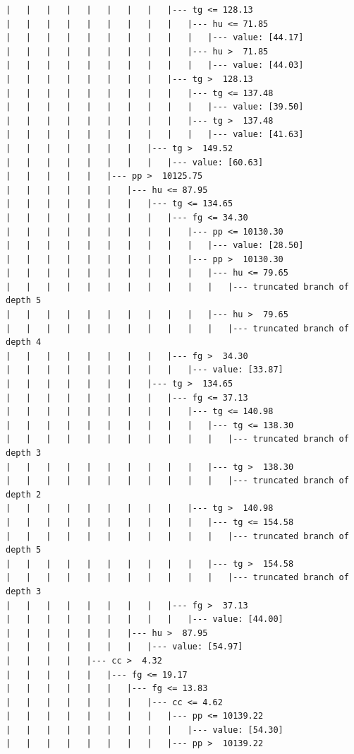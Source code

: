 \documentclass[UTF8, a4paper]{ctexart}
\begin{document}
\begin{lstlisting}
|   |   |   |   |   |   |   |   |--- tg <= 128.13
|   |   |   |   |   |   |   |   |   |--- hu <= 71.85
|   |   |   |   |   |   |   |   |   |   |--- value: [44.17]
|   |   |   |   |   |   |   |   |   |--- hu >  71.85
|   |   |   |   |   |   |   |   |   |   |--- value: [44.03]
|   |   |   |   |   |   |   |   |--- tg >  128.13
|   |   |   |   |   |   |   |   |   |--- tg <= 137.48
|   |   |   |   |   |   |   |   |   |   |--- value: [39.50]
|   |   |   |   |   |   |   |   |   |--- tg >  137.48
|   |   |   |   |   |   |   |   |   |   |--- value: [41.63]
|   |   |   |   |   |   |   |--- tg >  149.52
|   |   |   |   |   |   |   |   |--- value: [60.63]
|   |   |   |   |   |--- pp >  10125.75
|   |   |   |   |   |   |--- hu <= 87.95
|   |   |   |   |   |   |   |--- tg <= 134.65
|   |   |   |   |   |   |   |   |--- fg <= 34.30
|   |   |   |   |   |   |   |   |   |--- pp <= 10130.30
|   |   |   |   |   |   |   |   |   |   |--- value: [28.50]
|   |   |   |   |   |   |   |   |   |--- pp >  10130.30
|   |   |   |   |   |   |   |   |   |   |--- hu <= 79.65
|   |   |   |   |   |   |   |   |   |   |   |--- truncated branch of depth 5
|   |   |   |   |   |   |   |   |   |   |--- hu >  79.65
|   |   |   |   |   |   |   |   |   |   |   |--- truncated branch of depth 4
|   |   |   |   |   |   |   |   |--- fg >  34.30
|   |   |   |   |   |   |   |   |   |--- value: [33.87]
|   |   |   |   |   |   |   |--- tg >  134.65
|   |   |   |   |   |   |   |   |--- fg <= 37.13
|   |   |   |   |   |   |   |   |   |--- tg <= 140.98
|   |   |   |   |   |   |   |   |   |   |--- tg <= 138.30
|   |   |   |   |   |   |   |   |   |   |   |--- truncated branch of depth 3
|   |   |   |   |   |   |   |   |   |   |--- tg >  138.30
|   |   |   |   |   |   |   |   |   |   |   |--- truncated branch of depth 2
|   |   |   |   |   |   |   |   |   |--- tg >  140.98
|   |   |   |   |   |   |   |   |   |   |--- tg <= 154.58
|   |   |   |   |   |   |   |   |   |   |   |--- truncated branch of depth 5
|   |   |   |   |   |   |   |   |   |   |--- tg >  154.58
|   |   |   |   |   |   |   |   |   |   |   |--- truncated branch of depth 3
|   |   |   |   |   |   |   |   |--- fg >  37.13
|   |   |   |   |   |   |   |   |   |--- value: [44.00]
|   |   |   |   |   |   |--- hu >  87.95
|   |   |   |   |   |   |   |--- value: [54.97]
|   |   |   |   |--- cc >  4.32
|   |   |   |   |   |--- fg <= 19.17
|   |   |   |   |   |   |--- fg <= 13.83
|   |   |   |   |   |   |   |--- cc <= 4.62
|   |   |   |   |   |   |   |   |--- pp <= 10139.22
|   |   |   |   |   |   |   |   |   |--- value: [54.30]
|   |   |   |   |   |   |   |   |--- pp >  10139.22

\end{lstlisting}
\end{document}

